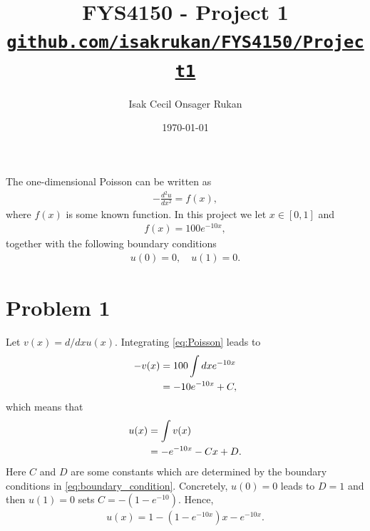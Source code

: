 \documentclass[english,notitlepage,reprint,nofootinbib]{revtex4-2}  %
\begin{document}
\title{FYS4150 - Project 1\\[0.5em]
  \small \href{https://github.com/isakrukan/FYS4150/tree/main/Project1}{\texttt{github.com/isakrukan/FYS4150/Project1}}
}
\author{Isak Cecil Onsager Rukan} %
\date{\today}                             %
\noaffiliation                            %
\maketitle
The one-dimensional Poisson can be written as 
\begin{align}
    -\frac{d^2u}{dx^2} = f(x),  \label{eq:Poisson}
\end{align}
where $f(x)$ is some known function. In this project we let \(x\in[0,1]\) and
\begin{align}
    f(x) = 100e^{-10x}, \label{eq:f_x}
\end{align}
together with the following boundary conditions
\begin{align}
    u(0)=0, \quad u(1)=0. \label{eq:boundary_condition}
\end{align}
\section{Problem 1}
Let $v(x)=d/dx u(x)$. Integrating \eqref{eq:Poisson} leads to 
\begin{align}
    -v(x) &= 100\int dxe^{-10x}
    \notag \\
    &= -10e^{-10x} + C,
\end{align}
which means that 
\begin{align}
    u(x) &= \int v(x) 
    \notag \\
    &= -e^{-10x} - Cx + D.
\end{align}
Here $C$ and $D$ are some constants which are determined by the boundary conditions in \eqref{eq:boundary_condition}. Concretely, \(u(0)=0\) leads to $D=1$ and then \(u(1)=0\) sets \(C=-(1-e^{-10})\). Hence,
\begin{align}
    u(x) = 1 - (1 - e^{-10x})x - e^{-10x}.  \label{eq:u_x}
\end{align}
\end{document}
